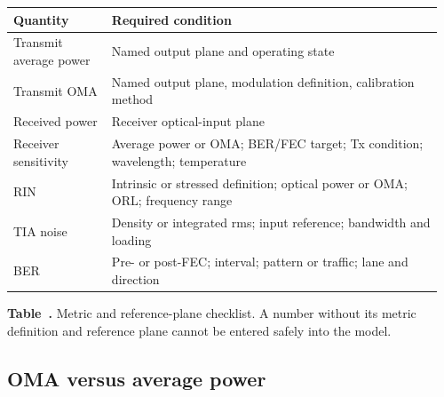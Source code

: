 \begin{table}[ht]
\label{tab:metric-planes}%
\centering
\setlength{\tabcolsep}{3pt}%
\footnotesize
\renewcommand{\arraystretch}{1.2}%
\begin{tabular}{@{}p{0.22\linewidth}p{0.74\linewidth}@{}}
\toprule
Quantity & Required condition \\
\midrule
Transmit average power & Named output plane and operating state \\
\addlinespace[0.7em]
Transmit OMA & Named output plane, modulation definition, calibration method \\
\addlinespace[0.7em]
Received power & Receiver optical-input plane \\
\addlinespace[0.7em]
Receiver sensitivity & Average power or OMA; BER/FEC target; Tx condition; wavelength; temperature \\
\addlinespace[0.7em]
RIN & Intrinsic or stressed definition; optical power or OMA; ORL; frequency range \\
\addlinespace[0.7em]
TIA noise & Density or integrated rms; input reference; bandwidth and loading \\
\addlinespace[0.7em]
BER & Pre- or post-FEC; interval; pattern or traffic; lane and direction \\
\bottomrule
\end{tabular}
\par\medskip
{\raggedright\footnotesize\textbf{Table~\thetable.} Metric and reference-plane
checklist. A number without its metric definition and reference plane cannot be
entered safely into the model.\par}
\end{table}


\subsection{OMA versus average power}

